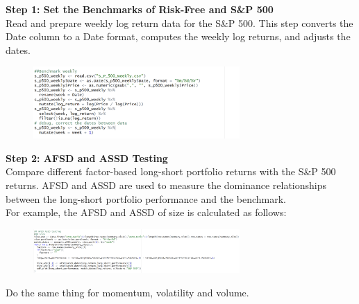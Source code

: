 \documentclass{article}
\begin{document}
\textbf{Step 1: Set the Benchmarks of Risk-Free and S\&P 500}\\
Read and prepare weekly log return data for the S\&P 500. This step converts the Date column to a Date format, computes the weekly log returns, and adjusts the dates.
\begin{figure}[H]
    \centering
    \includegraphics[width=0.7\textwidth]{15.png}
    \label{fig:example}
\end{figure}
\textbf{Step 2: AFSD and ASSD Testing}\\
Compare different factor-based long-short portfolio returns with the S\&P 500 returns. AFSD and ASSD are used to measure the dominance relationships between the long-short portfolio performance and the benchmark.\\
For example, the AFSD and ASSD of size is calculated as follows:
\begin{figure}[H]
    \centering
    \includegraphics[width=0.7\textwidth]{19.png}
    \label{fig:example}
\end{figure}
Do the same thing for momentum, volatility and volume.\\
\end{document}

